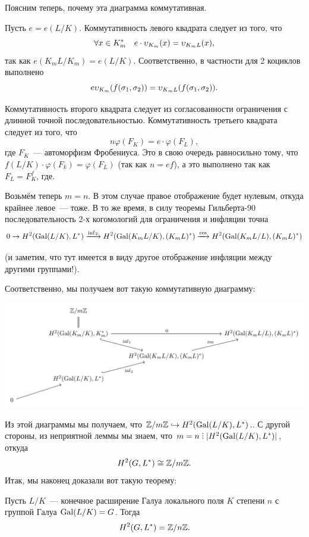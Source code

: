   	Поясним теперь, почему эта диаграмма коммутативная. 

   Пусть $e = e(L/K)$. Коммутативность левого квадрата следует из того, что 
  	\[
  		\forall x \in K_m^* \quad e \cdot \upsilon_{K_m}(x) = \upsilon_{K_m L}(x),
  	\]
  	так как $e(K_m L/K_m) = e(L/K)$. Соответственно, в частности для 2 коциклов выполнено 
  	\[
  		e \upsilon_{K_m}(f(\sigma_1, \sigma_2)) = \upsilon_{K_m L}(f(\sigma_1, \sigma_2)). 
  	\]

  	Коммутативность второго квадрата следует из согласованности ограничения с длинной точной последовательностью. Коммутативность третьего квадрата следует из того, что 
  	\[
  		n \varphi(F_K) = e \cdot \varphi(F_L),
  	\]
  	где $F_K$~--- автоморфизм Фробениуса. Это в свою очередь равносильно тому, что $f(L/K) \cdot \varphi(F_k) = \varphi(F_L)$ (так как $n = ef$), а это выполнено так как $F_L = F_K^{f}$, где.

  	Возьмём теперь $m = n$. В этом случае правое отображение будет нулевым, откуда крайнее левое~--- тоже. В то же время,  в силу теоремы Гильберта-90 последовательность 2-х когомологий для ограничения и инфляции точна
  	\[
  			0 \to H^2(\operatorname{Gal}(L/K), L^*) \xrightarrow{\inf_2} H^2(\operatorname{Gal}(K_m L/K), (K_m L)^*) \xrightarrow{\mathrm{res}} H^2(\operatorname{Gal}(K_m L/L), (K_m L)^*)
	\]

	(и заметим, что тут имеется в виду другое отображение инфляции между другими группами!). 

  	 Соответственно, мы получаем вот такую коммутативную диаграмму: 

  	 \begin{center}
  	 	\includegraphics{lectures/6/pictures/cd_32.pdf}
  	 \end{center}

  	 Из этой диаграммы мы получаем, что  $\mathbb{Z}/m\mathbb{Z} \hookrightarrow H^2(\operatorname{Gal}(L/K), L^*)$.. С другой стороны, из неприятной леммы мы знаем, что $m = n \divby |H^2(\Gal(L/K), L^*)| $, откуда 
  	 \[
  	 	H^2(G, L^*) \cong \mathbb{Z}/m\mathbb{Z}.
  	 \]
  	 Итак, мы наконец доказали вот такую теорему: 

  	 \begin{theorem} 
  	 	Пусть $L/K$~--- конечное расширение Галуа локального поля $K$ степени $n$ с группой Галуа $\operatorname{Gal}(L/K) = G$. Тогда 
  	 	\[
  	 		H^2(G, L^*) = \mathbb{Z}/n\mathbb{Z}.
  	 	\]
  	 \end{theorem}

